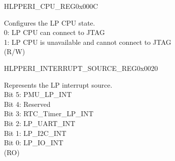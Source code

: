 \begin{register}{H}{LPPERI\_CPU\_REG}{0x000C}\label{regdesc:LPPERICPUREG}
%
%
\regnewline%
\begin{regdesc}\begin{reglist}
\label{fielddesc:LPPERILPCOREDBGMUNAVALIABLE}\item [LPPERI\_LPCORE\_DBGM\_UNAVALIABLE] Configures the LP CPU state.\\
0: LP CPU can connect to JTAG\\
1: LP CPU is unavailable and cannot connect to JTAG\\
(R/W)
\end{reglist}\end{regdesc}
\end{register}


\begin{register}{H}{LPPERI\_INTERRUPT\_SOURCE\_REG}{0x0020}\label{regdesc:LPPERIINTERRUPTSOURCEREG}
%
%
\regnewline%
\begin{regdesc}\begin{reglist}
\label{fielddesc:LPPERILPINTERRUPTSOURCE}\item [LPPERI\_LP\_INTERRUPT\_SOURCE] Represents the LP interrupt source.\\
Bit 5: PMU\_LP\_INT\\
Bit 4: Reserved\\
Bit 3: RTC\_Timer\_LP\_INT\\
Bit 2: LP\_UART\_INT\\
Bit 1: LP\_I2C\_INT\\
Bit 0: LP\_IO\_INT\\
(RO)
\end{reglist}\end{regdesc}
\end{register}
